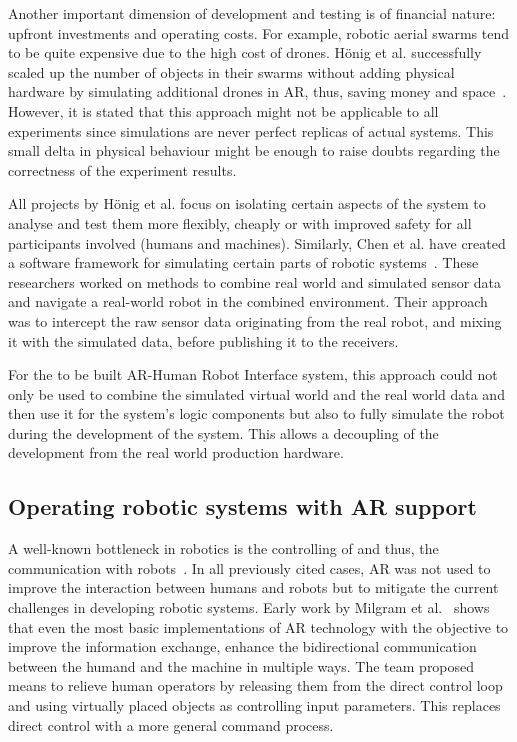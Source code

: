 Another important dimension of development and testing is of financial nature: upfront investments and operating costs. For example, robotic aerial swarms tend to be quite expensive due to the high cost of drones. Hönig et al. successfully scaled up the number of objects in their swarms without adding physical hardware by simulating additional drones in AR, thus, saving money and space~\cite{hoenig2015mixed}. However, it is stated that this approach might not be applicable to all experiments since simulations are never perfect replicas of actual systems. This small delta in physical behaviour might be enough to raise doubts regarding the correctness of the experiment results.

All projects by Hönig et al. focus on isolating certain aspects of the system to analyse and test them more flexibly, cheaply or with improved safety for all participants involved (humans and machines). Similarly, Chen et al. have created a software framework for simulating certain parts of robotic systems~\cite{chen2009mixed}. These researchers worked on methods to combine real world and simulated sensor data and navigate a real-world robot in the combined environment. Their approach was to intercept the raw sensor data originating from the real robot, and mixing it with the simulated data, before publishing it to the receivers.

For the to be built AR-Human Robot Interface system, this approach could not only be used to combine the simulated virtual world and the real world data and then use it for the system's logic components but also to fully simulate the robot during the development of the system. This allows a decoupling of the development from the real world production hardware.

\subsection{Operating robotic systems with AR support}
A well-known bottleneck in robotics is the controlling of and thus, the communication with robots~\cite{RoboticsScienceMag}. In all previously cited cases, AR was not used to improve the interaction between humans and robots but to mitigate the current challenges in developing robotic systems. Early work by Milgram et al.~\cite{milgram1993applications} shows that even the most basic implementations of AR technology with the objective to improve the information exchange, enhance the bidirectional communication between the humand and the machine in multiple ways. The team proposed means to relieve human operators by releasing them from the direct control loop and using virtually placed objects as controlling input parameters. This replaces direct control with a more general command process.

